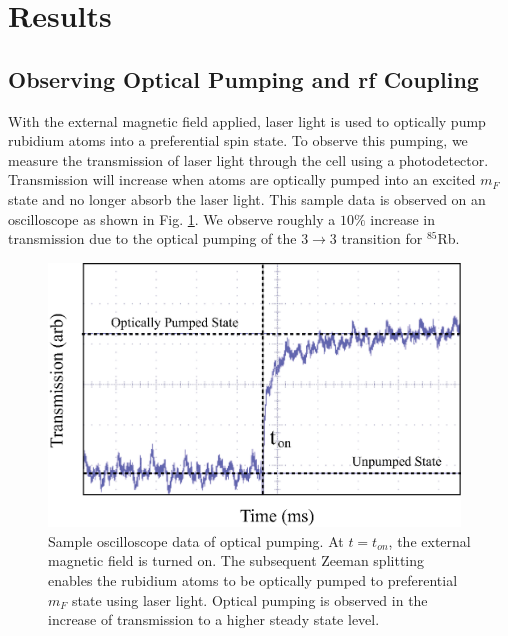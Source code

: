 

\section{Results}\label{results}

\subsection{Observing Optical Pumping and rf Coupling}\label{ObservingOpticalPumpingandrfCoupling}

With the external magnetic field applied, laser light is used to optically pump rubidium atoms into a preferential spin state.  To observe this pumping, we measure the transmission of laser light through the cell using a photodetector.  Transmission will increase when atoms are optically pumped into an excited $m_F$ state and no longer absorb the laser light. This sample data is observed on an oscilloscope as shown in Fig. \ref{fig:raw_data}.  We observe roughly a $10\%$ increase in transmission due to the optical pumping of the $3\rightarrow3$ transition for $^{85}$Rb.
\begin{figure}[htbp]
\begin{center}
\includegraphics[height=70mm]{./figures/raw_data.eps}
\caption{\small{Sample oscilloscope data of optical pumping. At $t=t_{on}$, the external magnetic field is turned on. The subsequent Zeeman splitting enables the rubidium atoms to be optically pumped to preferential $m_F$ state using laser light.  Optical pumping is observed in the increase of transmission to a higher steady state level.}}
\label{fig:raw_data}
\end{center}
\end{figure}

